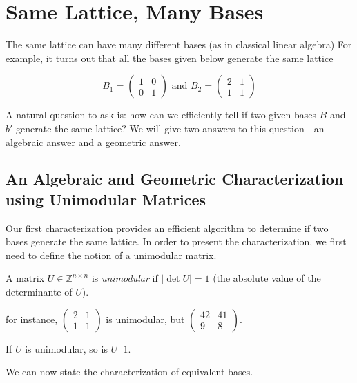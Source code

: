 \section{Same Lattice, Many Bases}

The same lattice can have many different bases (as in classical linear algebra)
For example, it turns out that all the bases given below generate the same 
lattice

$$ 
B_{1}=\left(\begin{matrix}1 & 0\\
0 & 1
\end{matrix}\right)\text{ and }B_{2}=\left(\begin{matrix}2 & 1\\
1 & 1
\end{matrix}\right)
$$


A natural question to ask is: how can we efficiently tell if two given bases $B$ and $b'$ generate the same lattice?
We will give two answers to this question - an algebraic answer and a geometric answer.

\subsection{An Algebraic and Geometric Characterization using Unimodular Matrices}
Our first characterization provides an efficient algorithm to determine if two bases generate the same
lattice. In order to present the characterization, we first need to define the notion of a unimodular matrix.


\begin{definition}
    A matrix $U\in \mathbb{Z}^{n\times n}$ is \emph{unimodular} if $| \det{U} |=1$ (the absolute value of the determinante of $U$).
\end{definition}

for instance, $\left(\begin{matrix}2 & 1\\
1 & 1
\end{matrix}\right)$ is unimodular, but $\left(\begin{matrix}42 & 41\\
    9 & 8
\end{matrix}\right) $.

\begin{proposition}
    If $U$ is unimodular, so is $U^-1$.
\end{proposition}

We can now state the characterization of equivalent bases.

